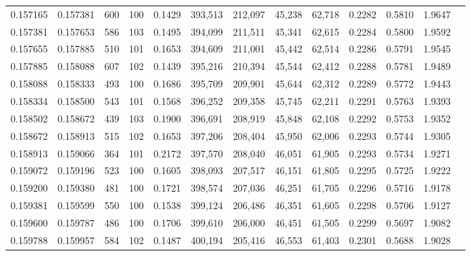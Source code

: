 \begin{tabular}{rrrrrrrrrrrrr}
0.157165 & 0.157381 &   600 & 100 &                                     0.1429 & 393,513 & 212,097 &  45,238 &  62,718 & 0.2282 & 0.5810 & 1.9647 \\
0.157381 & 0.157653 &   586 & 103 &                                     0.1495 & 394,099 & 211,511 &  45,341 &  62,615 & 0.2284 & 0.5800 & 1.9592 \\
0.157655 & 0.157885 &   510 & 101 &                                     0.1653 & 394,609 & 211,001 &  45,442 &  62,514 & 0.2286 & 0.5791 & 1.9545 \\
0.157885 & 0.158088 &   607 & 102 &                                     0.1439 & 395,216 & 210,394 &  45,544 &  62,412 & 0.2288 & 0.5781 & 1.9489 \\
0.158088 & 0.158333 &   493 & 100 &                                     0.1686 & 395,709 & 209,901 &  45,644 &  62,312 & 0.2289 & 0.5772 & 1.9443 \\
0.158334 & 0.158500 &   543 & 101 &                                     0.1568 & 396,252 & 209,358 &  45,745 &  62,211 & 0.2291 & 0.5763 & 1.9393 \\
0.158502 & 0.158672 &   439 & 103 &                                     0.1900 & 396,691 & 208,919 &  45,848 &  62,108 & 0.2292 & 0.5753 & 1.9352 \\
0.158672 & 0.158913 &   515 & 102 &                                     0.1653 & 397,206 & 208,404 &  45,950 &  62,006 & 0.2293 & 0.5744 & 1.9305 \\
0.158913 & 0.159066 &   364 & 101 &                                     0.2172 & 397,570 & 208,040 &  46,051 &  61,905 & 0.2293 & 0.5734 & 1.9271 \\
0.159072 & 0.159196 &   523 & 100 &                                     0.1605 & 398,093 & 207,517 &  46,151 &  61,805 & 0.2295 & 0.5725 & 1.9222 \\
0.159200 & 0.159380 &   481 & 100 &                                     0.1721 & 398,574 & 207,036 &  46,251 &  61,705 & 0.2296 & 0.5716 & 1.9178 \\
0.159381 & 0.159599 &   550 & 100 &                                     0.1538 & 399,124 & 206,486 &  46,351 &  61,605 & 0.2298 & 0.5706 & 1.9127 \\
0.159600 & 0.159787 &   486 & 100 &                                     0.1706 & 399,610 & 206,000 &  46,451 &  61,505 & 0.2299 & 0.5697 & 1.9082 \\
0.159788 & 0.159957 &   584 & 102 &                                     0.1487 & 400,194 & 205,416 &  46,553 &  61,403 & 0.2301 & 0.5688 & 1.9028 \\

\end{tabular}
